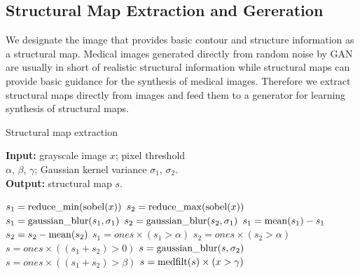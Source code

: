 \documentclass[runningheads]{llncs}
\begin{document}
	\subsection{Structural Map Extraction and Gereration}
	We designate the image that provides basic contour and structure information as a structural map. Medical images generated directly from random noise by GAN are usually in short of realistic structural information while structural maps can provide basic guidance for the synthesis of medical images. Therefore we extract structural maps directly from images and feed them to a generator for learning synthesis of structural maps.
	\vspace{-0.35cm}\begin{algorithm}[th]
		\caption{Structural map extraction}
		\label{alg:1}
	   \begin{multicols}{2}
			\hspace*{0.02in} {\bf Input: }grayscale image $x$; pixel threshold \\\hspace*{0.02in} $\alpha$, $\beta$, $\gamma$;
			Gaussian kernel variance $\sigma_1$, $\sigma_2$.\\
			\hspace*{0.02in} {\bf Output: }structural map $s$.
			\begin{algorithmic}[1]
				\State $s_1 = {\rm reduce\_min}({\rm sobel}(x))$
				\State $s_2 = {\rm reduce\_max}({\rm sobel}(x))$
				\State $s_1 = {\rm gaussian\_blur}(s_1,\sigma_1)$
				\State $s_2 = {\rm gaussian\_blur}(s_2,\sigma_1)$
				\State $s_1 = {\rm mean}(s_1) - s_1$
				\State $s_2 = s_2 - {\rm mean}(s_2)$
				\State $s_1 = ones \times (s_1 > \alpha)$
				\State $s_2 = ones \times (s_2 > \alpha)$
				\State $s = ones \times ((s_1 + s_2)> 0)$
				\State $s = {\rm gaussian\_blur}(s,\sigma_2)$
				\State $s = ones \times ((s_1 + s_2)> \beta)$
				\State $s = {\rm medfilt}(s)\times (x > \gamma)$
			\end{algorithmic} 
		\end{multicols}
		\vspace{-0.3cm}
	\end{algorithm}\vspace{-0.5cm}
\end{document}
